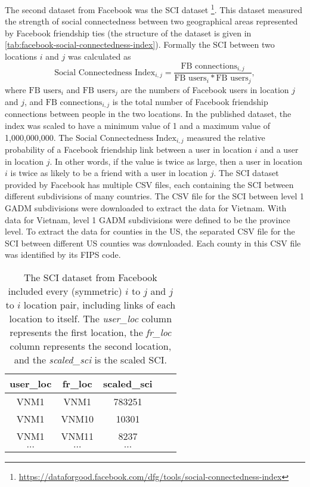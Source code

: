 The second dataset from Facebook was the \gls{SCI} dataset \footnote{\url{https://dataforgood.facebook.com/dfg/tools/social-connectedness-index}}.
This dataset measured the strength of social connectedness between two geographical areas represented by Facebook friendship ties (the structure of the dataset is given in \autoref{tab:facebook-social-connectedness-index}).
Formally the \gls{SCI} between two locations $i$ and $j$ was calculated as
\begin{equation*}
    \text{Social Connectedness Index}_{i,j} = \frac{\text{FB connections}_{i,j}}{\text{FB users}_i * \text{FB users}_j},
\end{equation*}
where $\text{FB users}_i$ and $\text{FB users}_j$ are the numbers of Facebook users in location $j$ and $j$, and $\text{FB connections}_{i,j}$ is the total number of Facebook friendship connections between people in the two locations.
In the published dataset, the index was scaled to have a minimum value of 1 and a maximum value of 1,000,000,000.
The $\text{Social Connectedness Index}_{i,j}$ measured the relative probability of a Facebook friendship link between a user in location $i$ and a user in location $j$.
In other words, if the value is twice as large, then a user in location $i$ is twice as likely to be a friend with a user in location $j$.
The \gls{SCI} dataset provided by Facebook has multiple \gls{CSV} files, each containing the \gls{SCI} between different subdivisions of many countries.
The \gls{CSV} file for the \gls{SCI} between level 1 \gls{GADM} subdivisions were downloaded to extract the data for Vietnam.
With data for Vietnam, level 1 \gls{GADM} subdivisions were defined to be the province level.
To extract the data for counties in the \gls{US}, the separated \gls{CSV} file for the \gls{SCI} between different \gls{US} counties was downloaded.
Each county in this \gls{CSV} file was identified by its \gls{FIPS} code.

\begin{table}[h]
\centering
\begin{tabular}{| c | c | c | c | c |}
    user\_loc & fr\_loc & scaled\_sci \\
    \hline\hline
    VNM1 & VNM1 & 783251 \\
    \hline
    VNM1 & VNM10 & 10301 \\
    \hline
    VNM1 & VNM11 & 8237 \\
    \hline
    $\cdots$ & $\cdots$ & $\cdots$ \\
\end{tabular}
\caption{The \gls{SCI} dataset from Facebook included every (symmetric) $i$ to $j$ and $j$ to $i$ location pair, including links of each location to itself. The \textit{user\_loc} column represents the first location, the \textit{fr\_loc} column represents the second location, and the \textit{scaled\_sci} is the scaled \gls{SCI}.}
\label{tab:facebook-social-connectedness-index}
\end{table}


